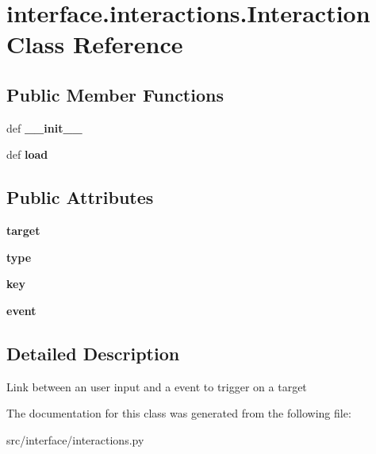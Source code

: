 \hypertarget{classinterface_1_1interactions_1_1_interaction}{\section{interface.\-interactions.\-Interaction \-Class \-Reference}
\label{classinterface_1_1interactions_1_1_interaction}
}
\subsection*{\-Public \-Member \-Functions}
\begin{DoxyCompactItemize}
\item 
\hypertarget{classinterface_1_1interactions_1_1_interaction_a8e24342fbab9b8508ab2c037cb2facf0}{def {\bfseries \-\_\-\-\_\-init\-\_\-\-\_\-}}\label{classinterface_1_1interactions_1_1_interaction_a8e24342fbab9b8508ab2c037cb2facf0}

\item 
\hypertarget{classinterface_1_1interactions_1_1_interaction_a077e8944f45e377ad3e6c225a545aa86}{def {\bfseries load}}\label{classinterface_1_1interactions_1_1_interaction_a077e8944f45e377ad3e6c225a545aa86}

\end{DoxyCompactItemize}
\subsection*{\-Public \-Attributes}
\begin{DoxyCompactItemize}
\item 
\hypertarget{classinterface_1_1interactions_1_1_interaction_a00cd1dee9a8dba184edb37428380bb92}{{\bfseries target}}\label{classinterface_1_1interactions_1_1_interaction_a00cd1dee9a8dba184edb37428380bb92}

\item 
\hypertarget{classinterface_1_1interactions_1_1_interaction_afae7611b19a4850489268d42de12281d}{{\bfseries type}}\label{classinterface_1_1interactions_1_1_interaction_afae7611b19a4850489268d42de12281d}

\item 
\hypertarget{classinterface_1_1interactions_1_1_interaction_a684bc327719b7885001513805775aae7}{{\bfseries key}}\label{classinterface_1_1interactions_1_1_interaction_a684bc327719b7885001513805775aae7}

\item 
\hypertarget{classinterface_1_1interactions_1_1_interaction_aa0201055cceaccb25b7808f2e8f39856}{{\bfseries event}}\label{classinterface_1_1interactions_1_1_interaction_aa0201055cceaccb25b7808f2e8f39856}

\end{DoxyCompactItemize}


\subsection{\-Detailed \-Description}
\begin{DoxyVerb}Link between an user input and a event to trigger on a target \end{DoxyVerb}
 

\-The documentation for this class was generated from the following file\-:\begin{DoxyCompactItemize}
\item 
src/interface/interactions.\-py\end{DoxyCompactItemize}
